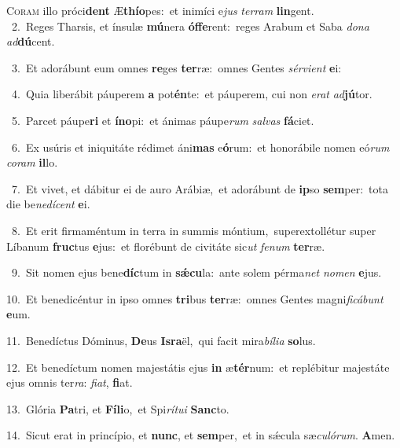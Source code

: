 \lettrine{\initial\textcolor{\initialcolor}{C}}{oram} illo próci\textbf{dent} Æ\-\textbf{thí}\-\textbf{o}pes:~\star et inimíci e\textit{jus} \textit{ter}\-\textit{ram} \textbf{lin}\-gent.\\
{\numbfont\textcolor{\numbcolor}{~2.}}~Reges Tharsis, et ínsulæ \textbf{mú}\-nera \textbf{óf}\-\textbf{fe}rent:~\star reges Arabum et Saba \textit{do}\-\textit{na} \textit{ad}\-\textbf{dú}cent.\par
{\numbfont\textcolor{\numbcolor}{~3.}}~Et adorábunt eum omnes \textbf{re}\-ges \textbf{ter}\-ræ:~\star omnes Gentes \textit{sér}\-\textit{vi}\textit{ent} \textbf{e}\-i:\par
{\numbfont\textcolor{\numbcolor}{~4.}}~Quia liberábit páuperem \textbf{a} pot\-\textbf{én}\-te:~\star et páuperem, cui non \textit{e}\-\textit{rat} \textit{ad}\-\textbf{jú}tor.\par
{\numbfont\textcolor{\numbcolor}{~5.}}~Parcet páupe\textbf{ri} et \textbf{ín}\-\textbf{o}pi:~\star et ánimas páupe\textit{rum} \textit{sal}\-\textit{vas} \textbf{fá}\-ciet.\par
{\numbfont\textcolor{\numbcolor}{~6.}}~Ex usúris et iniquitáte rédimet áni\textbf{mas} e\-\textbf{ó}\-rum:~\star et honorábile nomen eó\textit{rum} \textit{co}\-\textit{ram} \textbf{il}\-lo.\par
{\numbfont\textcolor{\numbcolor}{~7.}}~Et vivet, et dábitur ei de auro Arábiæ,~\dagger et adorábunt de \textbf{ip}\-so \textbf{sem}\-per:~\star tota die be\-\textit{ne}\-\textit{dí}\textit{cent} \textbf{e}\-i.\par
{\numbfont\textcolor{\numbcolor}{~8.}}~Et erit firmaméntum in terra in summis móntium,~\dagger superextollétur super Líbanum \textbf{fruc}\-tus \textbf{e}\-jus:~\star et florébunt de civitáte sic\textit{ut} \textit{fe}\-\textit{num} \textbf{ter}\-ræ.\par
{\numbfont\textcolor{\numbcolor}{~9.}}~Sit nomen ejus bene\-\textbf{díc}\-tum in \textbf{sǽ}\-\textbf{cu}la:~\star ante solem pérma\textit{net} \textit{no}\-\textit{men} \textbf{e}\-jus.\par
{\numbfont\textcolor{\numbcolor}{10.}}~Et benedicéntur in ipso omnes \textbf{tri}\-bus \textbf{ter}\-ræ:~\star omnes Gentes magni\-\textit{fi}\-\textit{cá}\textit{bunt} \textbf{e}\-um.\par
{\numbfont\textcolor{\numbcolor}{11.}}~Benedíctus Dóminus, \textbf{De}\-us \textbf{Is}\-\textbf{ra}ël,~\star qui facit mira\-\textit{bí}\-\textit{li}\textit{a} \textbf{so}\-lus.\par
{\numbfont\textcolor{\numbcolor}{12.}}~Et benedíctum nomen majestátis ejus \textbf{in} æ\-\textbf{tér}\-num:~\star et replébitur majestáte ejus omnis ter\-\textit{ra}\-: \textit{fi}\-\textit{at}, \textbf{fi}\-at.\par
{\numbfont\textcolor{\numbcolor}{13.}}~Glória \textbf{Pa}\-tri, et \textbf{Fí}\-\textbf{li}o,~\star et Spi\-\textit{rí}\-\textit{tu}\textit{i} \textbf{Sanc}\-to.\par
{\numbfont\textcolor{\numbcolor}{14.}}~Sicut erat in princípio, et \textbf{nunc}\-, et \textbf{sem}\-per,~\star et in sǽcula sæ\-\textit{cu}\-\textit{ló}\textit{rum}. \textbf{A}\-men.\par
